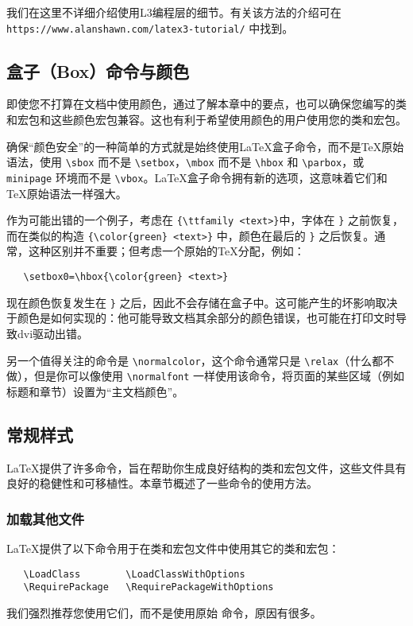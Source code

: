\documentclass[12pt]{ltxguide}
\providecommand\url[1]{\texttt{#1}}
\begin{document}
我们在这里不详细介绍使用L3编程层的细节。有关该方法的介绍可在 \url{https://www.alanshawn.com/latex3-tutorial/} 中找到。

\subsection{盒子（Box）命令与颜色}
即使您不打算在文档中使用颜色，通过了解本章中的要点，也可以确保您编写的类和宏包和这些颜色宏包兼容。这也有利于希望使用颜色的用户使用您的类和宏包。

确保“颜色安全”的一种简单的方式就是始终使用\LaTeX{}盒子命令，而不是\TeX{}原始语法，使用 \verb|\sbox| 而不是 \verb|\setbox|，\verb|\mbox| 而不是 \verb|\hbox| 和 \verb|\parbox|，或 \verb|minipage| 环境而不是 \verb|\vbox|。\LaTeX{}盒子命令拥有新的选项，这意味着它们和\TeX{}原始语法一样强大。

作为可能出错的一个例子，考虑在 \verb|{\ttfamily <text>}|中，字体在 \verb|}| 之前恢复，而在类似的构造 \verb|{\color{green} <text>}| 中，颜色在最后的 \verb|}| 之后恢复。通常，这种区别并不重要；但考虑一个原始的\TeX{}分配，例如：
\begin{verbatim}
   \setbox0=\hbox{\color{green} <text>}
\end{verbatim}
现在颜色恢复发生在 \verb|}| 之后，因此不会存储在盒子中。这可能产生的坏影响取决于颜色是如何实现的：他可能导致文档其余部分的颜色错误，也可能在打印文时导致dvi驱动出错。

另一个值得关注的命令是 \verb|\normalcolor|，这个命令通常只是 \verb|\relax|（什么都不做），但是你可以像使用 \verb|\normalfont| 一样使用该命令，将页面的某些区域（例如标题和章节）设置为“主文档颜色”。

\subsection{常规样式}
\LaTeX{}提供了许多命令，旨在帮助你生成良好结构的类和宏包文件，这些文件具有良好的稳健性和可移植性。本章节概述了一些命令的使用方法。

\subsubsection{加载其他文件}
\LaTeX{}提供了以下命令用于在类和宏包文件中使用其它的类和宏包：
%
\begin{verbatim}
   \LoadClass        \LoadClassWithOptions
   \RequirePackage   \RequirePackageWithOptions
\end{verbatim}
%
我们强烈推荐您使用它们，而不是使用原始 \verb|| 命令，原因有很多。
\end{document}
